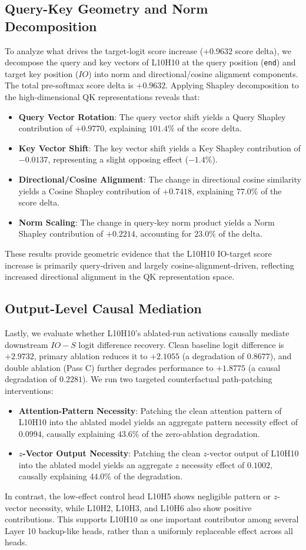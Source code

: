 \documentclass[12pt,a4paper]{article}
\begin{document}
\subsection{Query-Key Geometry and Norm Decomposition}
To analyze what drives the target-logit score increase ($+0.9632$ score delta), we decompose the query and key vectors of L10H10 at the query position (\texttt{end}) and target key position ($IO$) into norm and directional/cosine alignment components. 
The total pre-softmax score delta is $+0.9632$. Applying Shapley decomposition to the high-dimensional QK representations reveals that:
\begin{itemize}
  \item \textbf{Query Vector Rotation}: The query vector shift yields a Query Shapley contribution of $+0.9770$, explaining $101.4\%$ of the score delta.
  \item \textbf{Key Vector Shift}: The key vector shift yields a Key Shapley contribution of $-0.0137$, representing a slight opposing effect ($-1.4\%$).
  \item \textbf{Directional/Cosine Alignment}: The change in directional cosine similarity yields a Cosine Shapley contribution of $+0.7418$, explaining $77.0\%$ of the score delta.
  \item \textbf{Norm Scaling}: The change in query-key norm product yields a Norm Shapley contribution of $+0.2214$, accounting for $23.0\%$ of the delta.
\end{itemize}
These results provide geometric evidence that the L10H10 IO-target score increase is primarily query-driven and largely cosine-alignment-driven, reflecting increased directional alignment in the QK representation space.

\subsection{Output-Level Causal Mediation}
Lastly, we evaluate whether L10H10's ablated-run activations causally mediate downstream $IO - S$ logit difference recovery. Clean baseline logit difference is $+2.9732$, primary ablation reduces it to $+2.1055$ (a degradation of $0.8677$), and double ablation (Pass C) further degrades performance to $+1.8775$ (a causal degradation of $0.2281$).
We run two targeted counterfactual path-patching interventions:
\begin{itemize}
  \item \textbf{Attention-Pattern Necessity}: Patching the clean attention pattern of L10H10 into the ablated model yields an aggregate pattern necessity effect of $0.0994$, causally explaining $43.6\%$ of the zero-ablation degradation.
  \item \textbf{$z$-Vector Output Necessity}: Patching the clean $z$-vector output of L10H10 into the ablated model yields an aggregate $z$ necessity effect of $0.1002$, causally explaining $44.0\%$ of the degradation.
\end{itemize}
In contrast, the low-effect control head L10H5 shows negligible pattern or $z$-vector necessity, while L10H2, L10H3, and L10H6 also show positive contributions. This supports L10H10 as one important contributor among several Layer 10 backup-like heads, rather than a uniformly replaceable effect across all heads.
\end{document}
